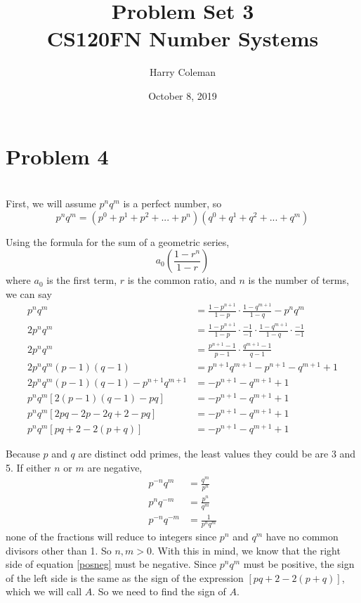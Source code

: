 \documentclass[12pt]{article}
\begin{document}
 
\title{Problem Set 3\\
    \large CS120FN Number Systems}
\author{Harry Coleman}
\date{October 8, 2019}

\maketitle

\section*{Problem 4}
\\

First, we will assume $p^nq^m$ is a perfect number, so
\[p^nq^m = (p^0 + p^1 + p^2 + ... + p^{n})(q^0 + q^1 + q^2 + ... + q^{m})\]

Using the formula for the sum of a geometric series,
\[a_0 \left(\frac{1-r^n}{1-r}\right)\]
where $a_0$ is the first term, $r$ is the common ratio, and $n$ is the number of terms, we can say
\begingroup
\addtolength{\jot}{7pt}
\begin{align}
    \nonumber p^nq^m      &= \frac{1-p^{n+1}}{1-p} \cdot \frac{1-q^{m+1}}{1-q} - p^nq^m \\
    \nonumber 2p^nq^m     &= \frac{1-p^{n+1}}{1-p} \cdot \frac{-1}{-1} \cdot \frac{1-q^{m+1}}{1-q} \cdot \frac{-1}{-1} \\
    \nonumber 2p^nq^m     &= \frac{p^{n+1}-1}{p-1} \cdot \frac{q^{m+1}-1}{q-1} \\
    \nonumber 2p^nq^m(p-1)(q-1)                   &= p^{n+1}q^{m+1} - p^{n+1} - q^{m+1} + 1 \\
    \nonumber 2p^nq^m(p-1)(q-1)-p^{n+1}q^{m+1}    &= - p^{n+1} - q^{m+1} + 1 \\
    \nonumber p^nq^m[2(p-1)(q-1) - pq]            &= - p^{n+1} - q^{m+1} + 1 \\
    \nonumber p^nq^m[2pq - 2p - 2q + 2 - pq]      &= - p^{n+1} - q^{m+1} + 1 \\
    p^nq^m[pq + 2 - 2(p + q)]           &= - p^{n+1} - q^{m+1} + 1 \label{posneg}
\end{align}
\endgroup

Because $p$ and $q$ are distinct odd primes, the least values they could be are 3 and 5. If either $n$ or $m$ are negative, 
\begin{align*}
    p^{-n}q^m &= \frac{q^m}{p^n} \\
    p^nq^{-m} &= \frac{p^n}{q^m} \\
    p^{-n}q^{-m} &= \frac{1}{p^nq^m}
\end{align*}
none of the fractions will reduce to integers since $p^n$ and $q^m$ have no common divisors other than 1. So $n,m>0$. With this in mind, we know that the right side of equation \ref{posneg} must be negative. Since $p^nq^m$ must be positive, the sign of the left side is the same as the sign of the expression $[pq + 2 - 2(p+q)]$, which we will call $A$. So we need to find the sign of $A$.
\end{document}
